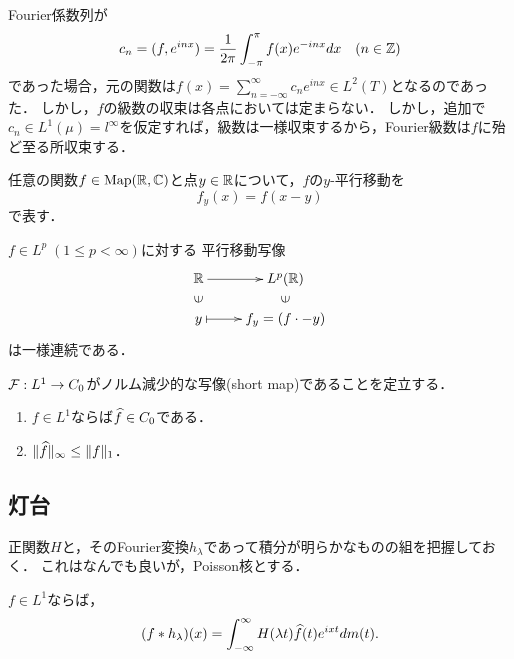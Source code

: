 \documentclass[uplatex,dvipdfmx]{jsreport}
\begin{document}
\begin{discussion}[Fourier級数に関する逆転公式]
    Fourier係数列が
    \[c_n=(f,e^{inx})=\frac{1}{2\pi}\int^\pi_{-\pi}f(x)e^{-inx}dx\quad(n\in\mathbb{Z})\]
    であった場合，元の関数は$f(x)=\sum^\infty_{n=-\infty}c_ne^{inx}\in L^2(T)$となるのであった．
    しかし，$f$の級数の収束は各点においては定まらない．
    しかし，追加で$c_n\in L^1(\mu)=l^\infty$を仮定すれば，級数は一様収束するから，Fourier級数は$f$に殆ど至る所収束する．
\end{discussion}

\begin{notation}
    任意の関数$f\in\mathrm{Map}(\mathbb{R},\mathbb{C})$と点$y\in\mathbb{R}$について，$f$の$y$-平行移動を
    \[f_y(x)=f(x-y)\]
    で表す．
\end{notation}

\begin{lemma}
    $f\in L^p\;(1\le p<\infty)$に対する
    平行移動写像
    \[\xymatrix@R-2pc{
        \R\ar[r]&L^p(\R)\\
        \rotatebox[origin=c]{90}{$\in$}&\rotatebox[origin=c]{90}{$\in$}\\
        y\ar@{|->}[r]&f_y=(f\cdot-y)
    }\]
    は一様連続である．
\end{lemma}

\begin{proposition}
    $\mathcal{F}:L^1\to C_0$がノルム減少的な写像(short map)であることを定立する．
    \begin{enumerate}
        \item $f\in L^1$ならば$\widehat{f}\in C_0$である．
        \item $\|\widehat{f}\|_\infty\le\|f\|_1$．
    \end{enumerate}
\end{proposition}

\subsection{灯台}

\begin{tcolorbox}[colframe=ForestGreen, colback=ForestGreen!10!white,breakable,colbacktitle=ForestGreen!40!white,coltitle=black,fonttitle=\bfseries\sffamily,
title=]
    正関数$H$と，そのFourier変換$h_\lambda$であって積分が明らかなものの組を把握しておく．
    これはなんでも良いが，Poisson核とする．
\end{tcolorbox}

\begin{proposition}
    $f\in L^1$ならば，
    \[(f*h_\lambda)(x)=\int^\infty_{-\infty}H(\lambda t)\widehat{f}(t)e^{ixt}dm(t).\]
\end{proposition}
\end{document}
